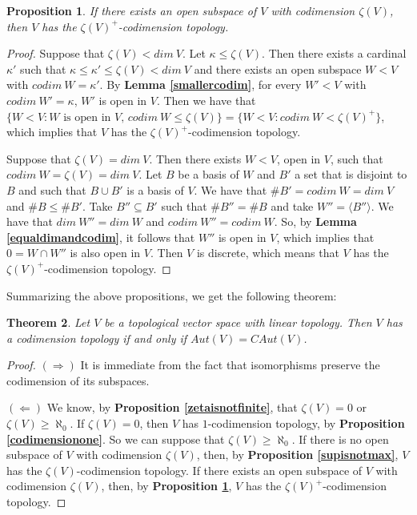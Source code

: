 \documentclass[a4paper,12pt]{article}
\newtheorem{prop}{Proposition}[section]
\newtheorem{teo}[prop]{Theorem}
\theoremstyle{bloco}
\begin{document}
\begin{prop}\label{supismax}If there exists an open subspace of $V$ with codimension $\zeta(V)$, then $V$ has the $\zeta(V)^{+}$-codimension topology.
\end{prop}

\begin{proof}Suppose that $\zeta(V) < dim \ V$. Let $\kappa \leqslant \zeta(V)$. Then there exists a cardinal $\kappa'$ such that $\kappa \leqslant \kappa' \leqslant \zeta(V) < dim \ V$ and there exists an open subspace $W < V$ with $codim \ W = \kappa'$. By \textbf{Lemma \ref{smallercodim}}, for every $W' < V$ with $codim \ W' = \kappa$, $W'$ is open in $V$. Then we have that $\{W < V: W \text{ is open in $V$, } codim \ W \leqslant \zeta(V) \} = \{W < V: codim \ W < \zeta(V)^{+} \}$, which implies that $V$ has the $\zeta(V)^{+}$-codimension topology.

Suppose that $\zeta(V) = dim \ V$. Then there exists  $W < V$, open in $V$, such that $codim \ W = \zeta(V) = dim \ V$. Let $B$ be a basis of $W$ and $B'$ a set that is disjoint to $B$ and such that $B \cup B'$ is a basis of $V$. We have that $\# B' = codim \ W = dim \ V$ and $\# B \leqslant \# B'$. Take $B'' \subseteq B'$ such that $\# B'' = \# B$ and take $W'' = \langle  B'' \rangle$. We have that $dim \ W'' = dim \ W$ and $codim \ W'' = codim \ W$. So, by \textbf{Lemma \ref{equaldimandcodim}}, it follows that $W''$ is open in $V$, which implies that $0 = W \cap W''$ is also open in $V$. Then $V$ is discrete, which means that $V$ has the $\zeta(V)^{+}$-codimension topology.   
\end{proof}

Summarizing the above propositions, we get the following theorem:

\begin{teo}\label{theoremone}Let $V$ be a topological vector space with linear topology. Then $V$ has a codimension topology if and only if $Aut(V) = CAut(V)$.   
\end{teo}

\begin{proof}$(\Rightarrow)$ It is immediate from the fact that isomorphisms preserve the codimension of its subspaces.

$(\Leftarrow)$ We know, by \textbf{Proposition \ref{zetaisnotfinite}}, that $\zeta(V) = 0$ or $\zeta(V) \geqslant \aleph_{0}$. If $\zeta(V) = 0$, then $V$ has $1$-codimension topology, by \textbf{Proposition \ref{codimensionone}}.  So we can suppose that $\zeta(V) \geqslant \aleph_{0}$. If there is no open subspace of $V$ with codimension $\zeta(V)$, then, by \textbf{Proposition \ref{supisnotmax}}, $V$ has the $\zeta(V)$-codimension topology. If there exists an open subspace of $V$ with codimension $\zeta(V)$, then, by \textbf{Proposition \ref{supismax}}, $V$ has the $\zeta(V)^{+}$-codimension topology.
\end{proof}
\end{document}
